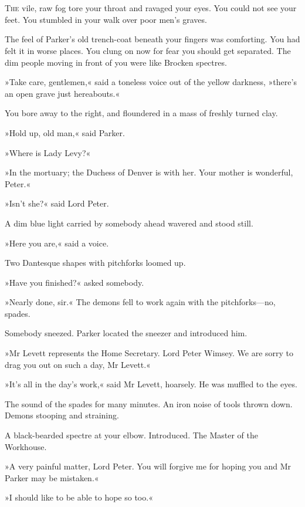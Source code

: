 \chapter[Chapter \thechapter]{}
\lettrine[lines=4]{T}{he} vile, raw fog tore your throat and ravaged your eyes. You could not see your feet. You stumbled in your walk over poor men's graves.

\zz
The feel of Parker's old trench-coat beneath your fingers was comforting. You had felt it in worse places. You clung on now for fear you should get separated. The dim people moving in front of you were like Brocken spectres.

»Take care, gentlemen,« said a toneless voice out of the yellow darkness, »there's an open grave just hereabouts.«

You bore away to the right, and floundered in a mass of freshly turned clay.

»Hold up, old man,« said Parker.

»Where is Lady Levy?«

»In the mortuary; the Duchess of Denver is with her. Your mother is wonderful, Peter.«

»Isn't she?« said Lord Peter.

A dim blue light carried by somebody ahead wavered and stood still.

»Here you are,« said a voice.

Two Dantesque shapes with pitchforks loomed up.

»Have you finished?« asked somebody.

»Nearly done, sir.« The demons fell to work again with the pitchforks—no, spades.

Somebody sneezed. Parker located the sneezer and introduced him.

»Mr Levett represents the Home Secretary. Lord Peter Wimsey. We are sorry to drag you out on such a day, Mr Levett.«

»It's all in the day's work,« said Mr Levett, hoarsely. He was muffled to the eyes.

The sound of the spades for many minutes. An iron noise of tools thrown down. Demons stooping and straining.

A black-bearded spectre at your elbow. Introduced. The Master of the Workhouse.

»A very painful matter, Lord Peter. You will forgive me for hoping you and Mr Parker may be mistaken.«

»I should like to be able to hope so too.«

